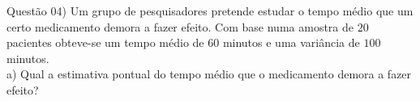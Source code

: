 
\noindent \textcolor{COLOR1}{Questão 04)} Um grupo de pesquisadores pretende estudar o tempo médio que um certo medicamento demora a fazer efeito. Com base numa amostra de $20$ pacientes obteve-se um tempo médio de $60$ minutos e uma variância de $100$ minutos.
\\

a) Qual a estimativa pontual do tempo médio que o medicamento demora a fazer efeito?